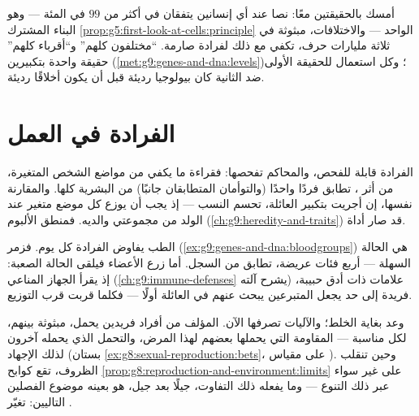 \begin{remark}\label{rem:g9:unique-individuals:alike}
أمسك بالحقيقتين معًا: نصا  عند أي إنسانين يتفقان في
أكثر من $99$ في المئة --- وهو البناء المشترك 
\cref{prop:g5:first-look-at-cells:principle} الواحد ---
والاختلافات، مبثوثة في ثلاثة مليارات حرف، تكفي مع ذلك
لفرادة صارمة. ``مختلفون كلهم'' و``أقرباء كلهم'' حقيقة
واحدة بتكبيرين
(\cref{met:g9:genes-and-dna:levels})؛ وكل استعمال
للحقيقة الأولى ضد الثانية كان بيولوجيا رديئة قبل أن
يكون أخلاقًا رديئة.
\end{remark}

\section{الفرادة في العمل}

\begin{example}\label{ex:g9:unique-individuals:forensics}
الفرادة قابلة للفحص، والمحاكم تفحصها: فقراءة ما يكفي من
مواضع الشخص المتغيرة، من أثر ، تطابق فردًا واحدًا
(والتوأمان المتطابقان جانبًا) من البشرية كلها. والمقارنة
نفسها، إن أجريت بتكبير العائلة، تحسم النسب --- إذ يجب أن
يوزع كل موضع متغير عند الولد من مجموعتي والديه. فمنطق
الألبوم (\cref{ch:g9:heredity-and-traits}) قد صار أداة.
\end{example}

\begin{example}\label{ex:g9:unique-individuals:medicine}
الطب يفاوض الفرادة كل يوم. فزمر 
(\cref{ex:g9:genes-and-dna:bloodgroups}) هي الحالة
السهلة --- أربع فئات عريضة، تطابق من السجل. أما زرع
الأعضاء فيلقى الحالة الصعبة: إذ يقرأ الجهاز المناعي
(\cref{ch:g9:immune-defenses} يشرح آلته) علامات ذات أدق
حبيبة، فريدة إلى حد يجعل المتبرعين يبحث عنهم في العائلة
أولًا --- فكلما قربت  قرب التوزيع.
\end{example}

\begin{proposition}\label{prop:g9:unique-individuals:reserve}
وعد  بغاية
الخلط؛ والآليات تصرفها الآن.  المؤلف من أفراد
فريدين يحمل، مبثوثة بينهم،  لكل مناسبة ---
المقاومة التي يحملها بعضهم لهذا المرض، والتحمل الذي
يحمله آخرون لذلك الإجهاد (بستان
\cref{ex:g8:sexual-reproduction:bets}، على مقياس
). وحين تنقلب الظروف، تقع كوابح
\cref{prop:g8:reproduction-and-environment:limits} على
غير سواء عبر ذلك التنوع --- وما يفعله ذلك التفاوت،
جيلًا بعد جيل، هو بعينه موضوع الفصلين التاليين: تغيّر
.
\end{proposition}
\admitted

